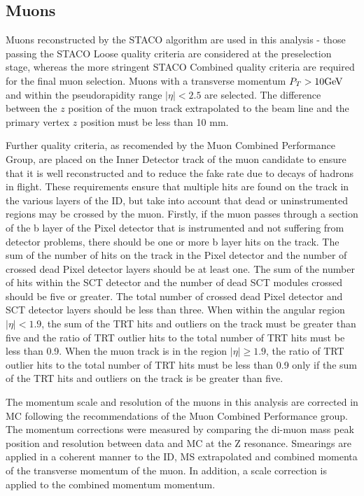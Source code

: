 \subsection{Muons}
\label{sec:presel:muon}

Muons reconstructed by the STACO algorithm \cite{AtlasCSCBook} are
used in this analysis - those passing the STACO Loose quality criteria
are considered at the preselection stage, whereas the more stringent
STACO Combined quality criteria are required for the final muon
selection. Muons with a transverse momentum $P_{T} > 10\text{GeV}$ and
within the pseudorapidity range $|\eta| < 2.5$ are selected. The
difference between the $z$ position of the muon track extrapolated to
the beam line and the primary vertex $z$ position must be less than 10
mm. 

Further quality criteria, as recomended by the Muon Combined Performance Group,
 are placed on the Inner Detector track of
the muon candidate to ensure that it is well reconstructed and to
reduce the fake rate due to decays of hadrons in flight. These
requirements ensure that multiple hits are found on the track in the
various layers of the ID, but take into account that dead or
uninstrumented regions may be crossed by the muon. Firstly, if the
muon passes through a section of the b layer of the Pixel detector
that is instrumented and not suffering from detector problems, there
should be one or more b layer hits on the track. The sum of the number
of hits on the track in the Pixel detector and the number of crossed
dead Pixel detector layers should be at least one. The sum of the
number of hits within the SCT detector and the number of dead SCT
modules crossed should be five or greater. The total number of crossed
dead Pixel detector and SCT detector layers should be less than three.
When within the angular region $|\eta|<1.9$, the sum of the TRT hits
and outliers on the track must be greater than five and the ratio of
TRT outlier hits to the total number of TRT hits must be less than
0.9. When the muon track is in the region $|\eta|\ge1.9$, the ratio of
TRT outlier hits to the total number of TRT hits must be less than 0.9
only if the sum of the TRT hits and outliers on the track is be
greater than five.

The momentum scale and resolution of the muons in this analysis are
corrected in MC following the recommendations of the Muon Combined
Performance group. The momentum corrections were measured by comparing
the di-muon mass peak position and resolution between data and MC at
the Z resonance. Smearings are applied in a coherent manner to
the ID, MS extrapolated and combined momenta of the transverse
momentum of the muon. In addition, a scale correction is applied to
the combined momentum momentum.

